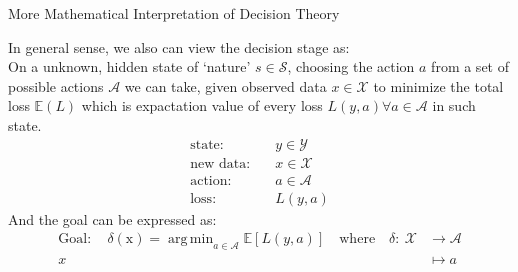 \documentclass{bredelebeamer}
\DeclareMathOperator*{\argmin}{arg\,min}
\begin{document}
\begin{frame}{More Mathematical Interpretation of Decision Theory}
  \begin{justify}
  In general sense, we also can view the decision stage as:\\
  On a unknown, hidden state of `nature' $s \in \mathcal{S}$, choosing the action
  $a$ from a set of possible actions $\mathcal{A}$ we can take, given observed
  data $x \in \mathcal{X}$ to minimize the total loss $\mathbb{E}(L)$
  which is expactation value of every loss $L(y,a) \forall a \in \mathcal{A}$ in
  such state.
  \begin{equation}
    \begin{split}
      \textrm{state}:    & \quad y \in \mathcal{Y} \\
      \textrm{new data}: & \quad x \in \mathcal{X} \\
      \textrm{action}:   & \quad a \in \mathcal{A} \\
      \textrm{loss}:     & \quad L(y,a)
    \end{split}
  \end{equation}
  And the goal can be expressed as:
  \begin{equation}
    \begin{split}
      \textrm{Goal}: \quad \delta (\mathrm{x}) = \argmin_{a \in \mathcal{A}} \mathbb{E}[L(y,a)] \quad
      \mathrm{where} \quad \delta : \: \mathcal{X} & \rightarrow \mathcal{A} \\
      x & \mapsto a
    \end{split}
  \end{equation}
  \end{justify}
\end{frame}
\end{document}
